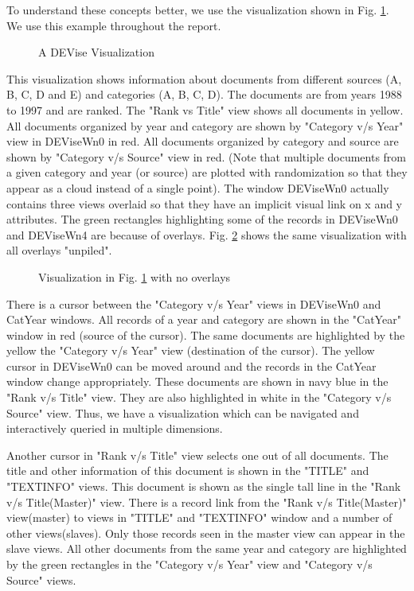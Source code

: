 To understand these concepts better, we use the visualization shown in
Fig. \ref{fig:vis}. We use this example throughout the report.

\begin{figure}[tbp]
\centerline{}
\caption{\label{fig:vis}{A DEVise Visualization}}
\end{figure}

This visualization shows information about documents from different sources
(A, B, C, D and E) and categories (A, B, C, D). The documents are from 
years 1988 to 1997 and are ranked. The "Rank vs Title" view shows all 
documents in yellow. All documents organized by year and category are
shown by "Category v/s Year" view in DEViseWn0 in red. All documents organized
by category and source are shown by "Category v/s Source" view in red. (Note
that multiple documents from a given category and year (or source) are plotted 
with randomization so that they appear as a cloud instead of a single point).
The window DEViseWn0 actually contains three views overlaid so that 
they have an implicit visual link on x and y attributes. The green rectangles
highlighting some of the records in DEViseWn0 and DEViseWn4 are because
of overlays. Fig. \ref{fig:visunpiled} shows the same visualization with all
overlays "unpiled". 

\begin{figure}[tbp]
\centerline{}
\caption{\label{fig:visunpiled}{Visualization in Fig. \ref{fig:vis} with no overlays}}
\end{figure}

There is a cursor between the "Category v/s Year" views in DEViseWn0 and 
CatYear windows. All records of a year and category are shown in the
"CatYear" window in red (source of the cursor). The same documents are
highlighted by the yellow  the "Category v/s Year" view (destination of the
cursor). The yellow cursor in DEViseWn0 can be moved around and the 
records in the CatYear window change appropriately. These documents are shown
in navy blue in the "Rank v/s Title" view.  They are also highlighted in white
in the "Category v/s Source" view. Thus, we have a visualization which can
be navigated and interactively queried in multiple dimensions.

Another cursor in "Rank v/s Title" view selects one out of all documents. 
The title and other information of this document is shown in the "TITLE" and
"TEXTINFO" views.  This document is shown as the single tall line in the
"Rank v/s Title(Master)" view. There is a record link from the 
"Rank v/s Title(Master)" view(master) to views in "TITLE" and "TEXTINFO" window
and a number of other views(slaves). Only those records seen in the master
view can appear in the slave views. All other documents from the same year and
category are highlighted by the green rectangles in the "Category v/s Year" 
view and "Category v/s Source" views. 

